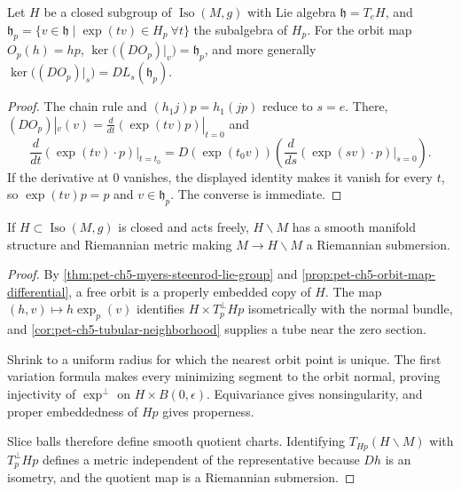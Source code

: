 \begin{proposition}
  \label{prop:pet-ch5-orbit-map-differential}

  Let $H$ be a closed subgroup of $\operatorname{Iso}(M,g)$ with Lie algebra
  $\mathfrak h=T_eH$, and $\mathfrak h_p=\{v\in\mathfrak h\mid\exp(tv)\in H_p\ \forall t\}$
  the subalgebra of $H_p$. For the orbit map $O_p(h)=hp$,
  $\ker\big((DO_p)|_v\big)=\mathfrak h_p$, and more generally
  $\ker\big((DO_p)|_s\big)=DL_s(\mathfrak h_p)$.
\end{proposition}
\begin{proof}
  \sketch
  The chain rule and $(h_1j)p=h_1(jp)$ reduce to $s=e$. There,
  $(DO_p)|_v(v)=\frac{d}{dt}(\exp(tv)p)|_{t=0}$ and
  \[
    \frac{d}{dt}(\exp(tv)\cdot p)\Big|_{t=t_0}
    =D(\exp(t_0v))\left(\frac{d}{ds}(\exp(sv)\cdot p)\Big|_{s=0}\right).
  \]
  If the derivative at $0$ vanishes, the displayed identity makes it vanish for
  every $t$, so $\exp(tv)p=p$ and $v\in\mathfrak h_p$. The converse is immediate.
\end{proof}

\begin{theorem}
  \label{thm:pet-ch5-free-slice-theorem}

  If $H\subset\operatorname{Iso}(M,g)$ is closed and acts freely, $H\backslash M$
  has a smooth manifold structure and Riemannian metric making $M\to H\backslash M$
  a Riemannian submersion.
\end{theorem}
\begin{proof}
  \sketch
  By \cref{thm:pet-ch5-myers-steenrod-lie-group} and
  \cref{prop:pet-ch5-orbit-map-differential}, a free orbit is a properly embedded
  copy of $H$.  The map $(h,v)\mapsto h\exp_p(v)$ identifies
  $H\times T_p^\perp Hp$ isometrically with the normal bundle, and
  \cref{cor:pet-ch5-tubular-neighborhood} supplies a tube near the zero section.

  Shrink to a uniform radius for which the nearest orbit point is unique.  The first
  variation formula makes every minimizing segment to the orbit normal, proving
  injectivity of $\exp^\perp$ on $H\times B(0,\epsilon)$.  Equivariance gives
  nonsingularity, and proper embeddedness of $Hp$ gives properness.

  Slice balls therefore define smooth quotient charts. Identifying
  $T_{Hp}(H\backslash M)$ with $T_p^\perp Hp$ defines a metric independent of the
  representative because $Dh$ is an isometry, and the quotient map is a Riemannian
  submersion.
\end{proof}

